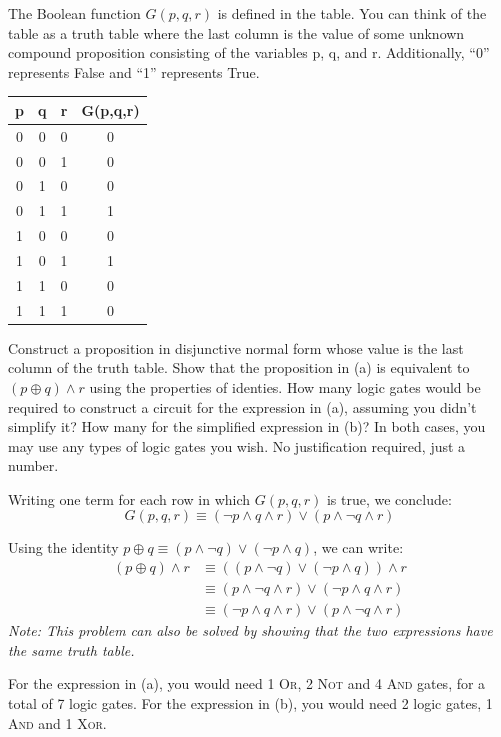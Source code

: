 \documentclass[solution, letterpaper]{cs20}
\begin{document}

The Boolean function $G(p,q,r)$ is defined in the table. You can think of the table as a truth table where the last column is the value of some unknown compound proposition consisting of the variables p, q, and r. Additionally, ``0'' represents False and ``1'' represents True. 


\begin{table}[h]
\centering

\begin{tabular}{| c c c | c |}
\hline
p & q & r & G(p,q,r) \\ \hline
0 & 0 & 0 & 0 \\ 
0 & 0 & 1 & 0 \\ 
0 & 1 & 0 & 0 \\ 
0 & 1 & 1 & 1 \\ 
1 & 0 & 0 & 0 \\ 
1 & 0 & 1 & 1 \\ 
1 & 1 & 0 & 0 \\ 
1 & 1 & 1 & 0 \\ \hline

\end{tabular}
\end{table}

\subproblem Construct a proposition in disjunctive normal form whose value is the last column of the truth table. 
\subproblem Show that the proposition in (a) is equivalent to $(p \oplus q)\land r$ using the properties of identies.
\subproblem How many logic gates would be required to construct a circuit for the expression in (a), assuming you didn't simplify it? How many for the simplified expression in (b)?  In both cases, you may use any types of logic gates you wish. No justification required, just a number. 

\begin{solution}

\subsolution
Writing one term for each row in which $G(p, q, r)$ is true, we conclude:
$$G(p, q, r) \equiv (\lnot p \land q \land r) \lor (p \land \lnot q \land r)$$

\subsolution
Using the identity $p \oplus q \equiv (p \land \lnot q) \lor (\lnot p \land q)$, we can write:
  \begin{align*}
      (p \oplus q) \land r & \equiv ((p \land \lnot q) \lor (\lnot p \land q)) \land r \\
                           & \equiv (p \land \lnot q \land r) \lor (\lnot p \land q \land r) \\
                           & \equiv (\lnot p \land q \land r) \lor (p \land \lnot q \land r)
  \end{align*}
\emph{Note:  This problem can also be solved by showing that the two expressions have the same truth table.}

\subsolution
For the expression in (a), you would need 1 \textsc{Or}, 2 \textsc{Not} and 4 \textsc{And} gates, for a total of 7 logic gates.
For the expression in (b), you would need 2 logic gates, 1 \textsc{And} and 1 \textsc{Xor}.

\end{solution}
\end{document}
